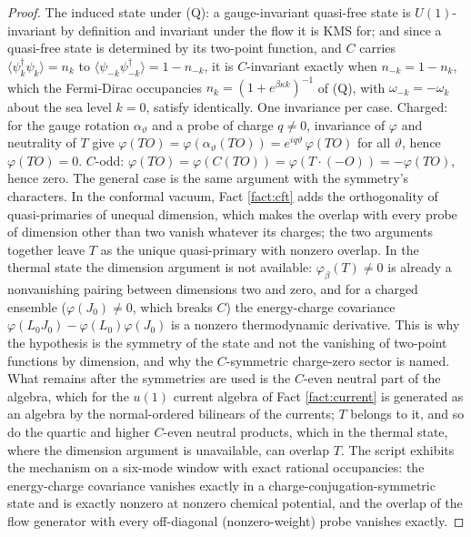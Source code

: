 \documentclass[11pt]{article}
\theoremstyle{definition}
\begin{document}
\begin{proof}
The induced state under (Q): a gauge-invariant quasi-free state is $U(1)$-invariant by definition and invariant under the flow it is KMS for; and since a quasi-free state is determined by its two-point function, and $C$ carries $\langle\psi^\dagger_k\psi_k\rangle = n_k$ to $\langle\psi_{-k}\psi^\dagger_{-k}\rangle = 1 - n_{-k}$, it is $C$-invariant exactly when $n_{-k} = 1 - n_k$, which the Fermi-Dirac occupancies $n_k = (1 + e^{\beta\kappa k})^{-1}$ of (Q), with $\omega_{-k} = -\omega_k$ about the sea level $k = 0$, satisfy identically. One invariance per case. Charged: for the gauge rotation $\alpha_\vartheta$ and a probe of charge $q \neq 0$, invariance of $\varphi$ and neutrality of $T$ give $\varphi(T O) = \varphi(\alpha_\vartheta(T O)) = e^{iq\vartheta}\,\varphi(T O)$ for all $\vartheta$, hence $\varphi(TO) = 0$. $C$-odd: $\varphi(T O) = \varphi(C(T O)) = \varphi(T\cdot(-O)) = -\varphi(TO)$, hence zero. The general case is the same argument with the symmetry's characters. In the conformal vacuum, Fact \ref{fact:cft} adds the orthogonality of quasi-primaries of unequal dimension, which makes the overlap with every probe of dimension other than two vanish whatever its charges; the two arguments together leave $T$ as the unique quasi-primary with nonzero overlap. In the thermal state the dimension argument is not available: $\varphi_\beta(T) \neq 0$ is already a nonvanishing pairing between dimensions two and zero, and for a charged ensemble ($\varphi(J_0) \neq 0$, which breaks $C$) the energy-charge covariance $\varphi(L_0 J_0) - \varphi(L_0)\varphi(J_0)$ is a nonzero thermodynamic derivative. This is why the hypothesis is the symmetry of the state and not the vanishing of two-point functions by dimension, and why the $C$-symmetric charge-zero sector is named. What remains after the symmetries are used is the $C$-even neutral part of the algebra, which for the $u(1)$ current algebra of Fact \ref{fact:current} is generated as an algebra by the normal-ordered bilinears of the currents; $T$ belongs to it, and so do the quartic and higher $C$-even neutral products, which in the thermal state, where the dimension argument is unavailable, can overlap $T$. The script exhibits the mechanism on a six-mode window with exact rational occupancies: the energy-charge covariance vanishes exactly in a charge-conjugation-symmetric state and is exactly nonzero at nonzero chemical potential, and the overlap of the flow generator with every off-diagonal (nonzero-weight) probe vanishes exactly.
\end{proof}
\end{document}
